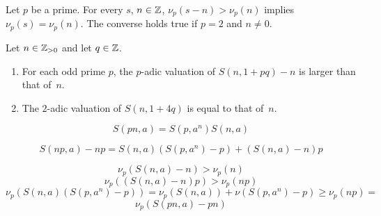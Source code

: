  Let $p$ be a prime.
 For every $s$, $n \in \mathbb{Z}$, 
 $\nu_p(s - n) > \nu_p(n)$ implies $\nu_p(s) = \nu_p(n)$.
 The converse holds true if $p = 2$ and $n \ne 0$.

 \begin{theorem} \label{thm:val-adic}
   Let $n \in \mathbb{Z}_{> 0}$ and let $q \in \mathbb{Z}$.
   \begin{enumerate}
   \item For each odd prime $p$, the $p$-adic valuation of $S(n, 1 + p q) - n$ is larger than that of~$n$.
   \item The $2$-adic valuation of $S(n, 1 + 4 q)$ is equal to that of~$n$.
   \end{enumerate} 
 \end{theorem}

 $$
 S(p n, a) = S(p, a^n) S(n, a) 
 $$

 $$
 S(np, a)  - np =  S(n, a) (S(p, a^n) - p) + (S(n, a) - n) p
 $$

 $$
 \nu_p(S(n, a) - n) > \nu_p(n) 
 $$
 $$
 \nu_p((S(n, a) - n) p) > \nu_p(np) 
 $$
 $$
\nu_p( S(n, a) (S(p, a^n) - p) ) = \nu_p(S(n, a)) + \nu(S(p, a^n) - p) \ge \nu_p(np) = 
 $$
 $$
 \nu_p(S(pn, a) - pn) 
 $$

 
